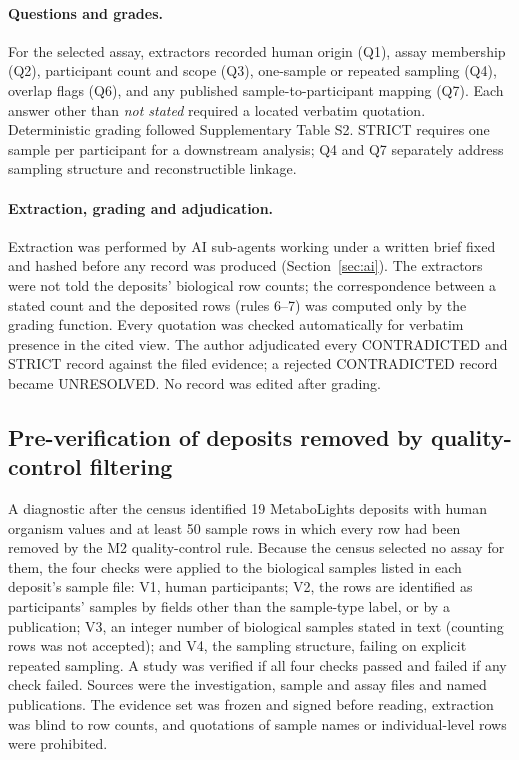\paragraph{Questions and grades.} For the selected assay, extractors recorded human origin (Q1), assay membership
(Q2), participant count and scope (Q3), one-sample or repeated sampling (Q4), overlap flags (Q6), and any published
sample-to-participant mapping (Q7). Each answer other than \emph{not stated} required a located verbatim quotation. Deterministic
grading followed Supplementary Table S2. STRICT requires one sample per participant for a downstream analysis;
Q4 and Q7 separately address sampling structure and reconstructible linkage.

\paragraph{Extraction, grading and adjudication.} Extraction was performed by AI sub-agents working under a written
brief fixed and hashed before any record was produced (Section~\ref{sec:ai}). The extractors were not told the
deposits' biological row counts; the correspondence between a stated count and the deposited rows (rules 6--7) was
computed only by the grading function. Every quotation was checked automatically for verbatim presence in the cited
view. The author adjudicated every CONTRADICTED and STRICT record against the filed evidence; a rejected
CONTRADICTED record became UNRESOLVED. No record was edited after grading.

\subsection{Pre-verification of deposits removed by quality-control filtering}\label{sec:a35}

A diagnostic after the census identified 19 MetaboLights deposits with human organism values and at least 50 sample
rows in which every row had been removed by the M2 quality-control rule. Because the census selected no assay for
them, the four checks were applied to the biological samples listed in each deposit's sample file: V1, human
participants; V2, the rows are identified as participants' samples by fields other than the sample-type label, or by
a publication; V3, an integer number of biological samples stated in text (counting rows was not accepted); and V4,
the sampling structure, failing on explicit repeated sampling. A study was verified if all four checks passed and
failed if any check failed. Sources were the investigation, sample and assay files and named publications. The
evidence set was frozen and signed before reading, extraction was blind to row counts, and quotations of sample
names or individual-level rows were prohibited.

